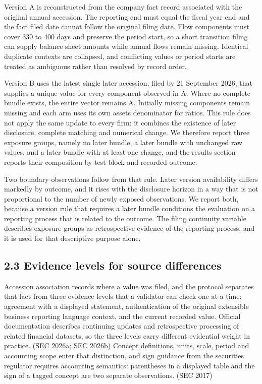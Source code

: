 \documentclass[10pt,a4paper,twocolumn]{article}
\begin{document}
Version A is reconstructed from the company fact record associated with the original annual accession. The reporting end must equal the fiscal year end and the fact filed date cannot follow the original filing date. Flow components must cover 330 to 400 days and preserve the period start, so a short transition filing can supply balance sheet amounts while annual flows remain missing. Identical duplicate contexts are collapsed, and conflicting values or period starts are treated as ambiguous rather than resolved by record order.

Version B uses the latest single later accession, filed by 21 September 2026, that supplies a unique value for every component observed in A. Where no complete bundle exists, the entire vector remains A. Initially missing components remain missing and each arm uses its own assets denominator for ratios. This rule does not apply the same update to every firm: it combines the existence of later disclosure, complete matching and numerical change. We therefore report three exposure groups, namely no later bundle, a later bundle with unchanged raw values, and a later bundle with at least one change, and the results section reports their composition by test block and recorded outcome.

Two boundary observations follow from that rule. Later version availability differs markedly by outcome, and it rises with the disclosure horizon in a way that is not proportional to the number of newly exposed observations. We report both, because a version rule that requires a later bundle conditions the evaluation on a reporting process that is related to the outcome. The filing continuity variable describes exposure groups as retrospective evidence of the reporting process, and it is used for that descriptive purpose alone.

\subsection{2.3 Evidence levels for source differences}

Accession association records where a value was filed, and the protocol separates that fact from three evidence levels that a validator can check one at a time: agreement with a displayed statement, authentication of the original extensible business reporting language context, and the current recorded value. Official documentation describes continuing updates and retrospective processing of related financial datasets, so the three levels carry different evidential weight in practice. (SEC 2026a; SEC 2026b) Concept definitions, units, scale, period and accounting scope enter that distinction, and sign guidance from the securities regulator requires accounting semantics: parentheses in a displayed table and the sign of a tagged concept are two separate observations. (SEC 2017)
\end{document}
